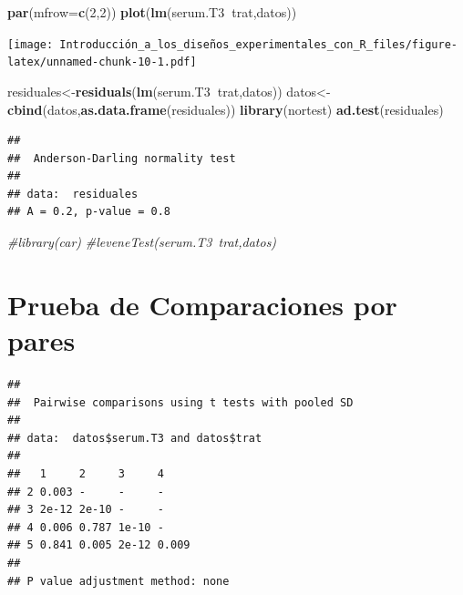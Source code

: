 \documentclass[]{book}
\newenvironment{Shaded}{\begin{snugshade}}{\end{snugshade}}
\newcommand{\KeywordTok}[1]{\textcolor[rgb]{0.13,0.29,0.53}{\textbf{#1}}}
\newcommand{\DataTypeTok}[1]{\textcolor[rgb]{0.13,0.29,0.53}{#1}}
\newcommand{\DecValTok}[1]{\textcolor[rgb]{0.00,0.00,0.81}{#1}}
\newcommand{\StringTok}[1]{\textcolor[rgb]{0.31,0.60,0.02}{#1}}
\newcommand{\CommentTok}[1]{\textcolor[rgb]{0.56,0.35,0.01}{\textit{#1}}}
\newcommand{\OperatorTok}[1]{\textcolor[rgb]{0.81,0.36,0.00}{\textbf{#1}}}
\newcommand{\NormalTok}[1]{#1}
\begin{document}
\begin{Shaded}
\begin{Highlighting}[]
\KeywordTok{par}\NormalTok{(}\DataTypeTok{mfrow=}\KeywordTok{c}\NormalTok{(}\DecValTok{2}\NormalTok{,}\DecValTok{2}\NormalTok{))}
\KeywordTok{plot}\NormalTok{(}\KeywordTok{lm}\NormalTok{(serum.T3}\OperatorTok{~}\NormalTok{trat,datos))}
\end{Highlighting}
\end{Shaded}

\texttt{[image: Introducción\_a\_los\_diseños\_experimentales\_con\_R\_files/figure-latex/unnamed-chunk-10-1.pdf]}

\begin{Shaded}
\begin{Highlighting}[]
\NormalTok{residuales<-}\KeywordTok{residuals}\NormalTok{(}\KeywordTok{lm}\NormalTok{(serum.T3}\OperatorTok{~}\NormalTok{trat,datos))}
\NormalTok{datos<-}\KeywordTok{cbind}\NormalTok{(datos,}\KeywordTok{as.data.frame}\NormalTok{(residuales))}
\KeywordTok{library}\NormalTok{(nortest)}
\KeywordTok{ad.test}\NormalTok{(residuales)}
\end{Highlighting}
\end{Shaded}

\begin{verbatim}
## 
##  Anderson-Darling normality test
## 
## data:  residuales
## A = 0.2, p-value = 0.8
\end{verbatim}

\begin{Shaded}
\begin{Highlighting}[]
\CommentTok{#library(car)}
\CommentTok{#leveneTest(serum.T3~trat,datos)}
\end{Highlighting}
\end{Shaded}

\section{Prueba de Comparaciones por
pares}\label{prueba-de-comparaciones-por-pares}

\begin{Shaded}
\end{Shaded}

\begin{verbatim}
## 
##  Pairwise comparisons using t tests with pooled SD 
## 
## data:  datos$serum.T3 and datos$trat 
## 
##   1     2     3     4    
## 2 0.003 -     -     -    
## 3 2e-12 2e-10 -     -    
## 4 0.006 0.787 1e-10 -    
## 5 0.841 0.005 2e-12 0.009
## 
## P value adjustment method: none
\end{verbatim}
\end{document}
